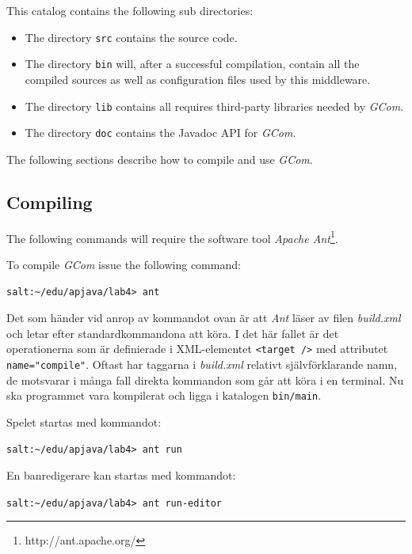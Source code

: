 \documentclass[titlepage, twocolumn, a4paper, 10pt]{article}
\begin{document}
This catalog contains the following sub directories:
\begin{itemize}
\item The directory \verb!src! contains the source code.
\item The directory \verb!bin! will, after a successful compilation,
  contain all the compiled sources as well as configuration files used
  by this middleware.
\item The directory \verb!lib! contains all requires third-party libraries
  needed by \textit{GCom}.
\item The directory \verb!doc! contains the Javadoc API for \textit{GCom}.
\end{itemize}

The following sections describe how to compile and use \textit{GCom}.

\subsection{Compiling}\label{sec:compiling}
The following commands will require the software tool \textit{Apache
  Ant}\footnote{http://ant.apache.org/}.

 To compile \textit{GCom} issue the following command:\\
 \begin{footnotesize}
 \verb!salt:~/edu/apjava/lab4> ant!
 \end{footnotesize}

 Det som händer vid anrop av kommandot ovan är att \textit{Ant} läser
 av filen \textit{build.xml} och letar efter standardkommandona att
 köra. I det här fallet är det operationerna som är definierade i
 XML-elementet \verb!<target />! med attributet
 \verb!name="compile"!. Oftast har taggarna i \textit{build.xml}
 relativt självförklarande namn, de motsvarar i många fall direkta
 kommandon som går att köra i en terminal. Nu ska programmet vara
 kompilerat och ligga i katalogen \verb!bin/main!.

 Spelet startas med kommandot:\\
 \begin{footnotesize}
 \verb!salt:~/edu/apjava/lab4> ant run!
 \end{footnotesize}

 En banredigerare kan startas med kommandot:\\
 \begin{footnotesize}
 \verb!salt:~/edu/apjava/lab4> ant run-editor!
 \end{footnotesize}
\end{document}
